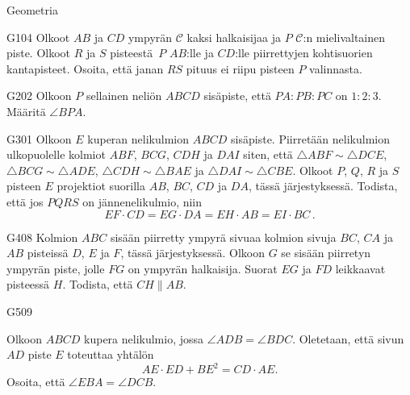 \begin{bwField}{Geometria}

\begin{bwProblem}{G}{1}{04}
Olkoot $AB$ ja $CD$ ympyrän $\mathcal{C}$ kaksi halkaisijaa ja $P$
$\mathcal{C}$:n mielivaltainen piste. Olkoot $R$ ja $S$ pisteestä~$P$
$AB$:lle ja $CD$:lle piirrettyjen kohtisuorien kantapisteet. Osoita,
että janan $RS$ pituus ei riipu pisteen $P$ valinnasta.
\end{bwProblem}


\begin{bwProblem}{G}{2}{02}
Olkoon $P$ sellainen neliön  $ABCD$ sisäpiste, että $PA:PB:PC$ on $1:2:3$. Määritä $\angle BPA$.
\end{bwProblem}


\begin{bwProblem}{G}{3}{01}
Olkoon $E$ kuperan nelikulmion $ABCD$ sisäpiste.
Piirretään nelikulmion ulkopuolelle kolmiot $ABF$, $ BCG$, $ CDH$ ja $
DAI$ siten, että $\triangle ABF \sim \triangle DCE$, $\triangle BCG
\sim \triangle ADE$, $ \triangle CDH \sim \triangle BAE$ ja $\triangle
DAI \sim \triangle CBE$. Olkoot $P$, $Q$, $R$ ja $S$ pisteen $E$
projektiot suorilla $AB$, $BC$, $CD$ ja $DA$, tässä järjestyksessä.
Todista, että jos $PQRS$ on jännenelikulmio, niin
\begin{equation*}
  EF \cdot CD = EG \cdot DA = EH \cdot AB = EI \cdot BC \,.
\end{equation*}

\end{bwProblem}


\begin{bwProblem}{G}{4}{08}
Kolmion $ABC$ sisään piirretty ympyrä sivuaa kolmion sivuja $BC$,
$CA$ ja $AB$ pisteissä $D$, $E$ ja $F$, tässä järjestyksessä. Olkoon
$G$ se sisään piirretyn ympyrän piste, jolle $FG$ on ympyrän
halkaisija. Suorat $EG$ ja $FD$ leikkaavat pisteessä $H$. Todista,
että $CH\parallel AB$.
\end{bwProblem}

\begin{bwProblem}{G}{5}{09}

Olkoon $ABCD$ kupera nelikulmio, jossa $\angle ADB=\angle BDC$.
Oletetaan, että sivun $AD$ piste $E$ toteuttaa yhtälön 
$$AE\cdot ED+BE^2=CD\cdot AE.$$
Osoita, että $\angle EBA=\angle DCB$.

\end{bwProblem}
\end{bwField}